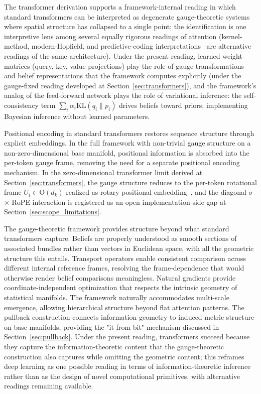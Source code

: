 \documentclass[11pt]{article}
\begin{document}
The transformer derivation supports a framework-internal reading in which standard transformers can be interpreted as degenerate gauge-theoretic systems where spatial structure has collapsed to a single point; the identification is one interpretive lens among several equally rigorous readings of attention (kernel-method, modern-Hopfield, and predictive-coding interpretations~\cite{tsai2019transformer, ramsauer2021hopfield, millidge2021predictive} are alternative readings of the same architecture). Under the present reading, learned weight matrices (query, key, value projections) play the role of gauge transformations and belief representations that the framework computes explicitly (under the gauge-fixed reading developed at Section~\ref{sec:transformers}), and the framework's analog of the feed-forward network plays the role of variational inference: the self-consistency term $\sum_i \alpha_i \mathrm{KL}(q_i \| p_i)$ drives beliefs toward priors, implementing Bayesian inference without learned parameters.

Positional encoding in standard transformers restores sequence structure through explicit embeddings. In the full framework with non-trivial gauge structure on a non-zero-dimensional base manifold, positional information is absorbed into the per-token gauge frame, removing the need for a separate positional encoding mechanism. In the zero-dimensional transformer limit derived at Section~\ref{sec:transformers}, the gauge structure reduces to the per-token rotational frame $U_i \in \mathrm{O}(d_k)$ realized as rotary positional embedding~\cite{su2024roformer}, and the diagonal-$\sigma$ $\times$ RoPE interaction is registered as an open implementation-side gap at Section~\ref{sec:scope_limitations}.

The gauge-theoretic framework provides structure beyond what standard transformers capture. Beliefs are properly understood as smooth sections of associated bundles rather than vectors in Euclidean space, with all the geometric structure this entails. Transport operators enable consistent comparison across different internal reference frames, resolving the frame-dependence that would otherwise render belief comparisons meaningless. Natural gradients provide coordinate-independent optimization that respects the intrinsic geometry of statistical manifolds. The framework naturally accommodates multi-scale emergence, allowing hierarchical structure beyond flat attention patterns. The pullback construction connects information geometry to induced metric structure on base manifolds, providing the "it from bit" mechanism discussed in Section~\ref{sec:pullback}. Under the present reading, transformers succeed because they capture the information-theoretic content that the gauge-theoretic construction also captures while omitting the geometric content; this reframes deep learning as one possible reading in terms of information-theoretic inference rather than as the design of novel computational primitives, with alternative readings remaining available.
\end{document}

